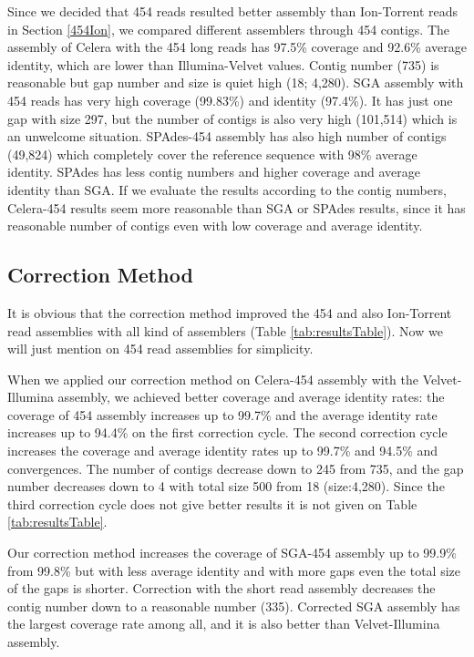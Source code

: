 \documentclass{llncs}
\begin{document}
Since we decided that 454 reads resulted better assembly than Ion-Torrent reads in Section \ref{454Ion}, we compared different assemblers through 454 contigs. The assembly of Celera with the 454 long reads has 97.5\% coverage and 92.6\% average identity, which are lower than Illumina-Velvet values. Contig number (735) is reasonable but gap number and size is quiet high (18; 4,280). 
SGA assembly with 454 reads has very high coverage (99.83\%) and identity (97.4\%). It has just one gap with size 297, but the number of contigs is also very high (101,514) which is an unwelcome situation. SPAdes-454 assembly has also high number of contigs (49,824) which completely cover the reference sequence with 98\% average identity. SPAdes has less contig numbers and higher coverage and average identity than SGA. 
If we evaluate the results according to the contig numbers, Celera-454 results seem more reasonable than SGA or SPAdes results, since it has reasonable number of contigs even with low coverage and average identity.

\subsection{Correction Method}

It is obvious that the correction method improved the 454 and also Ion-Torrent read assemblies with all kind of assemblers (Table \ref{tab:resultsTable}). Now we will just mention on 454 read assemblies for simplicity.

When we applied our correction method on Celera-454 assembly with the Velvet-Illumina assembly, we achieved better coverage and average identity rates: the coverage of 454 assembly increases up to 99.7\% and the average identity rate increases up to 94.4\% on the first correction cycle. The second correction cycle increases the coverage and average identity rates up to 99.7\% and 94.5\% and convergences. The number of contigs decrease down to 245 from 735, and the gap number decreases down to 4 with total size 500 from 18 (size:4,280). Since the third correction cycle does not give better results it is not given on Table \ref{tab:resultsTable}.

Our correction method increases the coverage of SGA-454 assembly up to 99.9\% from 99.8\% but with less average identity and with more gaps even the total size of the gaps is shorter. Correction with the short read assembly decreases the contig number down to a reasonable number (335). Corrected SGA assembly has the largest coverage rate among all, and it is also better than Velvet-Illumina assembly.
\end{document}
